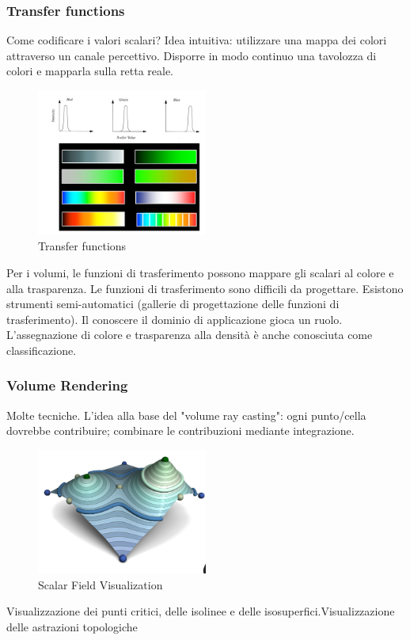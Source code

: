 \subsubsection{Transfer functions}
Come codificare i valori scalari?
Idea intuitiva: utilizzare una mappa dei colori attraverso un canale percettivo.
Disporre in modo continuo una tavolozza di colori e mapparla sulla retta reale.
\begin{figure}[H]
    \centering
    \includegraphics[width=0.5\textwidth]{images/transfFunctions.png} 
    \caption{Transfer functions}
    \label{fig:immagine}
\end{figure}
Per i volumi, le funzioni di trasferimento possono mappare gli scalari al colore e alla trasparenza. Le funzioni di trasferimento sono difficili da progettare. Esistono strumenti semi-automatici (gallerie di progettazione delle funzioni di trasferimento). Il conoscere il dominio di applicazione gioca un ruolo.
L'assegnazione di colore e trasparenza alla densità è anche conosciuta come classificazione.
\subsubsection{Volume Rendering}
Molte tecniche. L'idea alla base del "volume ray casting": ogni punto/cella dovrebbe contribuire; combinare le contribuzioni mediante integrazione.
\begin{figure}[H]
    \centering
    \includegraphics[width=0.5\textwidth]{images/ScalarField.png} 
    \caption{Scalar Field Visualization}
    \label{fig:immagine}
\end{figure}
Visualizzazione dei punti critici, delle isolinee e delle isosuperfici.Visualizzazione delle astrazioni topologiche

